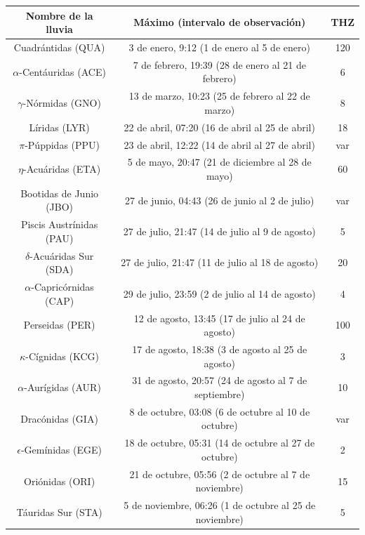 \documentclass[12pt,a4paper,oneside]{article}
\begin{document}
\begin{table}[h!b!t!]
\begin{center}
\resizebox{12cm}{!} {
\begin{tabular}{|c|c|c|}
\hline 
\textbf{Nombre de la lluvia}&	\textbf{M\'aximo (intervalo de observaci\'on)}  &	\textbf{THZ}\\ 
\hline 
Cuadr\'antidas (QUA) &	3 de enero, 9:12 (1 de enero al 5 de enero) &	120\\ 
\hline 
$\alpha$-Cent\'auridas (ACE) &	7 de febrero, 19:39 (28 de enero al 21 de febrero) & 6\\ 
\hline 
$\gamma$-N\'ormidas (GNO) &	13 de marzo, 10:23 (25 de febrero al 22 de marzo) & 8\\ 
\hline 
L\'iridas (LYR) &	22 de abril, 07:20 (16 de abril al 25 de abril) & 	18\\ 
\hline 
$\pi$-P\'uppidas (PPU) &	23 de abril, 12:22 (14 de abril al 27 de abril) &	var\\ 
\hline 
$\eta$-Acu\'aridas (ETA) & 5 de mayo, 20:47 (21 de diciembre al 28 de mayo) & 	60\\ 
\hline 
Bootidas de Junio (JBO) & 27 de junio, 04:43 (26 de junio al 2 de julio) &	var\\ 
\hline 
Piscis Austr\'inidas (PAU) &	27 de julio, 21:47 (14 de julio al 9 de agosto) &	5\\ 
\hline 
$\delta$-Acu\'aridas Sur (SDA) &	27 de julio, 21:47 (11 de julio al 18 de agosto) &	20\\ 
\hline 
$\alpha$-Capric\'ornidas (CAP) &	29 de julio, 23:59 (2 de julio al 14 de agosto) &	4\\ 
\hline 
Perseidas (PER) 	& 12 de agosto, 13:45 (17 de julio al 24 de agosto) &	100\\ 
\hline 
$\kappa$-C\'ignidas (KCG) &	17 de agosto, 18:38 (3 de agosto al 25 de agosto) &	3\\ 
\hline 
$\alpha$-Aur\'igidas (AUR) &	31 de agosto, 20:57 (24 de agosto al 7 de septiembre) &	10\\ 
\hline 
Drac\'onidas (GIA) &	8 de octubre, 03:08 (6 de octubre al 10 de octubre) &	var\\ 
\hline 
$\epsilon$-Gem\'inidas (EGE) & 18 de octubre, 05:31 (14 de octubre al 27 de octubre) & 	 2\\ 
\hline
Ori\'onidas (ORI) & 	21 de octubre, 05:56 (2 de octubre al 7 de noviembre) &	15\\ 
\hline 
T\'auridas Sur (STA) 	& 5 de noviembre, 06:26 (1 de octubre al 25 de noviembre) &	5\\ 
\hline 

\end{tabular}}
\end{center}
\end{table}
\end{document}
